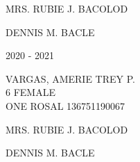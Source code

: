\documentclass{article}
\begin{document}
{{\begin{multicols}{2}
\vspace*{25mm}
\begin{flushright}
MRS. RUBIE J. BACOLOD \hspace*{-1.5em}
\end{flushright}  
\vspace*{1.5mm}
\hspace*{3em} DENNIS M. BACLE
\end{multicols} 
\newpage
\begin{multicols}{2}
\phantom{u}
\columnbreak
\vspace*{-3mm}
\begin{center}
\phantom{school year:} \hspace*{6em} 2020 - 2021 
\end{center} 
\vspace{4mm} 
\phantom{Name:} \hspace*{5em} VARGAS, AMERIE TREY P. \\[2.5mm] %
\phantom{Age} \hspace*{8em} 6  \phantom{Sex} \hspace*{12em} FEMALE \\[2.5mm] %
\phantom{Grade} \hspace*{3em} ONE \phantom{Section} \hspace*{4em} ROSAL \phantom{LRN} \hspace*{4em} 136751190067 \\
\vspace*{25mm}
\begin{flushright}
MRS. RUBIE J. BACOLOD \hspace*{-1.5em}
\end{flushright}  
\vspace*{1.5mm}
\hspace*{3em} DENNIS M. BACLE
\end{multicols} 
\newpage
}}
\end{document}
